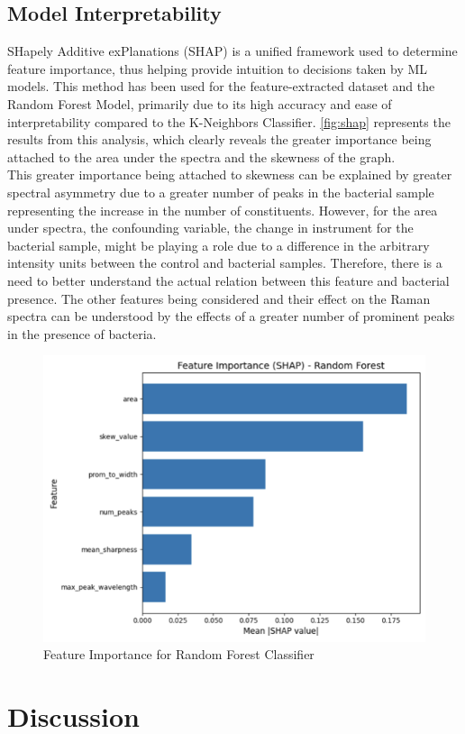 \subsection{Model Interpretability}

SHapely Additive exPlanations (SHAP) is a unified framework used to determine feature importance, thus helping provide intuition to decisions taken by ML models. \cite{LundbergLee2017_SHAP} This method has been used for the feature-extracted dataset and the Random Forest Model, primarily due to its high accuracy and ease of interpretability compared to the K-Neighbors Classifier. \autoref{fig:shap} represents the results from this analysis, which clearly reveals the greater importance being attached to the area under the spectra and the skewness of the graph. \\

\noindent This greater importance being attached to skewness can be explained by greater spectral asymmetry due to a greater number of peaks in the bacterial sample representing the increase in the number of constituents. However, for the area under spectra, the confounding variable, the change in instrument for the bacterial sample, might be playing a role due to a difference in the arbitrary intensity units between the control and bacterial samples. Therefore, there is a need to better understand the actual relation between this feature and bacterial presence. The other features being considered and their effect on the Raman spectra can be understood by the effects of a greater number of prominent peaks in the presence of bacteria. 

\begin{figure}
    \centering
    \includegraphics[width=0.5\linewidth]{Figures/shap.png}
    \caption{Feature Importance for Random Forest Classifier}
    \label{fig:shap}
\end{figure}

\section{Discussion}

